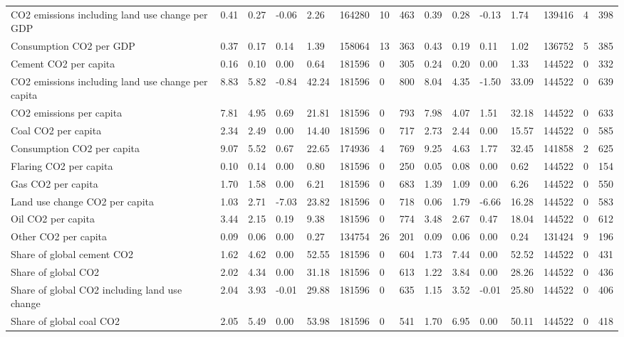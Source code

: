 \begin{longtable}{lllllllllllllll}
CO2 emissions including land use change per GDP & 0.41 & 0.27 & -0.06 & 2.26 & 164280 & 10 & 463 & 0.39 & 0.28 & -0.13 & 1.74 & 139416 & 4 & 398\\
\addlinespace
Consumption CO2 per GDP & 0.37 & 0.17 & 0.14 & 1.39 & 158064 & 13 & 363 & 0.43 & 0.19 & 0.11 & 1.02 & 136752 & 5 & 385\\
Cement CO2 per capita & 0.16 & 0.10 & 0.00 & 0.64 & 181596 & 0 & 305 & 0.24 & 0.20 & 0.00 & 1.33 & 144522 & 0 & 332\\
CO2 emissions including land use change per capita & 8.83 & 5.82 & -0.84 & 42.24 & 181596 & 0 & 800 & 8.04 & 4.35 & -1.50 & 33.09 & 144522 & 0 & 639\\
CO2 emissions per capita & 7.81 & 4.95 & 0.69 & 21.81 & 181596 & 0 & 793 & 7.98 & 4.07 & 1.51 & 32.18 & 144522 & 0 & 633\\
Coal CO2 per capita & 2.34 & 2.49 & 0.00 & 14.40 & 181596 & 0 & 717 & 2.73 & 2.44 & 0.00 & 15.57 & 144522 & 0 & 585\\
\addlinespace
Consumption CO2 per capita & 9.07 & 5.52 & 0.67 & 22.65 & 174936 & 4 & 769 & 9.25 & 4.63 & 1.77 & 32.45 & 141858 & 2 & 625\\
Flaring CO2 per capita & 0.10 & 0.14 & 0.00 & 0.80 & 181596 & 0 & 250 & 0.05 & 0.08 & 0.00 & 0.62 & 144522 & 0 & 154\\
Gas CO2 per capita & 1.70 & 1.58 & 0.00 & 6.21 & 181596 & 0 & 683 & 1.39 & 1.09 & 0.00 & 6.26 & 144522 & 0 & 550\\
Land use change CO2 per capita & 1.03 & 2.71 & -7.03 & 23.82 & 181596 & 0 & 718 & 0.06 & 1.79 & -6.66 & 16.28 & 144522 & 0 & 583\\
Oil CO2 per capita & 3.44 & 2.15 & 0.19 & 9.38 & 181596 & 0 & 774 & 3.48 & 2.67 & 0.47 & 18.04 & 144522 & 0 & 612\\
\addlinespace
Other CO2 per capita & 0.09 & 0.06 & 0.00 & 0.27 & 134754 & 26 & 201 & 0.09 & 0.06 & 0.00 & 0.24 & 131424 & 9 & 196\\
Share of global cement CO2 & 1.62 & 4.62 & 0.00 & 52.55 & 181596 & 0 & 604 & 1.73 & 7.44 & 0.00 & 52.52 & 144522 & 0 & 431\\
Share of global CO2 & 2.02 & 4.34 & 0.00 & 31.18 & 181596 & 0 & 613 & 1.22 & 3.84 & 0.00 & 28.26 & 144522 & 0 & 436\\
Share of global CO2 including land use change & 2.04 & 3.93 & -0.01 & 29.88 & 181596 & 0 & 635 & 1.15 & 3.52 & -0.01 & 25.80 & 144522 & 0 & 406\\
Share of global coal CO2 & 2.05 & 5.49 & 0.00 & 53.98 & 181596 & 0 & 541 & 1.70 & 6.95 & 0.00 & 50.11 & 144522 & 0 & 418\\

\end{longtable}
